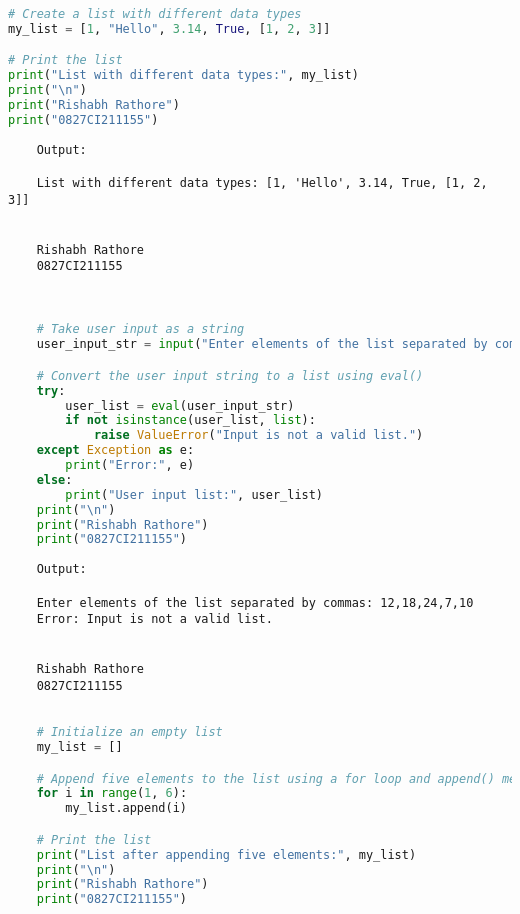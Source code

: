 \documentclass{report}
\begin{document}
\sol{}
\begin{lstlisting}[language=Python]
# Create a list with different data types
my_list = [1, "Hello", 3.14, True, [1, 2, 3]]

# Print the list
print("List with different data types:", my_list)
print("\n")
print("Rishabh Rathore")
print("0827CI211155")
\end{lstlisting}

\begin{verbatim}
	Output:

	List with different data types: [1, 'Hello', 3.14, True, [1, 2, 3]]


	Rishabh Rathore
	0827CI211155
	
\end{verbatim}
\bigskip


\sol{}
\begin{lstlisting}[language=Python]

	# Take user input as a string
	user_input_str = input("Enter elements of the list separated by commas: ")

	# Convert the user input string to a list using eval()
	try:
		user_list = eval(user_input_str)
		if not isinstance(user_list, list):
			raise ValueError("Input is not a valid list.")
	except Exception as e:
		print("Error:", e)
	else:
		print("User input list:", user_list)
	print("\n")
	print("Rishabh Rathore")
	print("0827CI211155")
\end{lstlisting}

\begin{verbatim}
	Output:

	Enter elements of the list separated by commas: 12,18,24,7,10
	Error: Input is not a valid list.
	
	
	Rishabh Rathore
	0827CI211155
\end{verbatim}
\bigskip


\sol{}
\begin{lstlisting}[language=Python]

	# Initialize an empty list
	my_list = []

	# Append five elements to the list using a for loop and append() method
	for i in range(1, 6):
		my_list.append(i)

	# Print the list
	print("List after appending five elements:", my_list)
	print("\n")
	print("Rishabh Rathore")
	print("0827CI211155")

\end{lstlisting}
\end{document}
